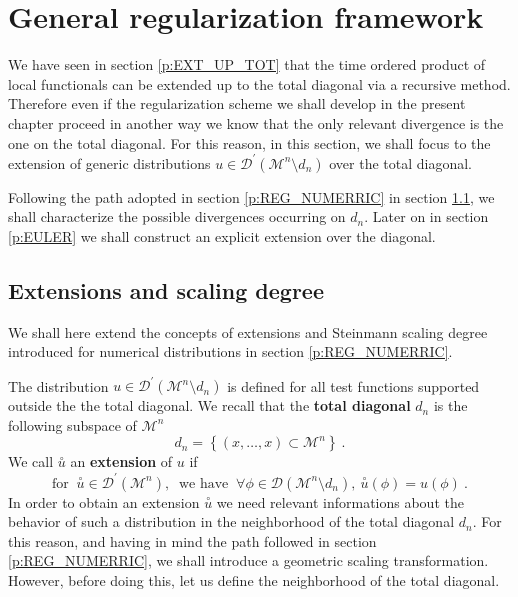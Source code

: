 \documentclass[11pt]{book}
\newcommand{\exte}[1]{\overset{\circ}{#1}}
\newcommand{\Dcal}{\mathcal{D}}
\newcommand{\Mcal}{\mathcal{M}}
\theoremstyle{break}
\begin{document}
\section{General regularization framework}
\label{p:REG_GENERAL}


We have seen in section \ref{p:EXT_UP_TOT} that the time ordered product of local functionals can be extended up to the total diagonal via a recursive method. Therefore even if the regularization scheme we shall develop in the present chapter proceed in another way we know that the only relevant divergence is the one on the total diagonal. For this reason, in this section, we shall focus to the extension of generic distributions $u \in \Dcal^\prime(\Mcal^n \setminus d_n )$ over the total diagonal.\par%


Following the path adopted in section \ref{p:REG_NUMERRIC} in section \ref{p:EXT_SD}, we shall characterize the possible divergences occurring on $d_n$. Later on in section \ref{p:EULER} we shall construct an  explicit extension over the diagonal.


\subsection{Extensions and scaling degree}
\label{p:EXT_SD}


We shall here extend the concepts of extensions and Steinmann scaling degree introduced for numerical distributions in section \ref{p:REG_NUMERRIC}. 


The distribution $u \in \Dcal^\prime(\Mcal^n \setminus d_n )$ is defined for all test functions supported outside the the total diagonal. We recall that the \textbf{total diagonal} $d_n$ is the following subspace of $\Mcal^n$
%
\begin{equation}
d_n = \left\{ (x,\dots,x) \subset \Mcal^n \right\} \ .
\label{eq:total_diag_chap_3}
\end{equation}
%
We call $\exte{u}$ an \textbf{extension} of $u$ if 
%
\begin{equation*}
\mbox{for } \ \exte{u} \in \Dcal^\prime(\Mcal^n), \ \mbox{ we have } \ \forall \phi \in \Dcal\left(\Mcal^n \setminus d_n \right), \ \exte{u}(\phi) = u(\phi) \ .
\end{equation*}
%
In order to obtain an extension $\exte{u}$ we need relevant informations about the behavior of such a distribution in the neighborhood of the total diagonal $d_n$. For this reason, and having in mind the path followed in section \ref{p:REG_NUMERRIC}, we shall introduce a geometric scaling transformation. However, before doing this, let us define the neighborhood of the total diagonal.
\end{document}
